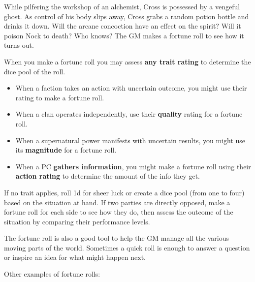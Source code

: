 \begin{qb}While pilfering the workshop of an alchemist, Cross is possessed by a vengeful ghost. As control of his body slips away, Cross grabs a random potion bottle and drinks it down. Will the arcane concoction have an effect on the spirit? Will it poison Nock to death? Who knows? The GM makes a fortune roll to see how it turns out.\end{qb}

When you make a fortune roll you may assess \textbf{any trait rating} to determine the dice pool of the roll.

\begin{itemize}
\item When a faction takes an action with uncertain outcome, you might use their  rating to make a fortune roll.
\item When a clan operates independently, use their \textbf{quality} rating for a fortune roll.
\item When a supernatural power manifests with uncertain results, you might use its \textbf{magnitude} for a fortune roll.
\item When a PC \textbf{gathers information}, you might make a fortune roll using their \textbf{action rating} to determine the amount of the info they get.
\end{itemize}

If no trait applies, roll 1d for sheer luck or create a dice pool (from one to four) based on the situation at hand. If two parties are directly opposed, make a fortune roll for each side to see how they do, then assess the outcome of the situation by comparing their performance levels.

The fortune roll is also a good tool to help the GM manage all the various moving parts of the world. Sometimes a quick roll is enough to answer a question or inspire an idea for what might happen next.

Other examples of fortune rolls:

